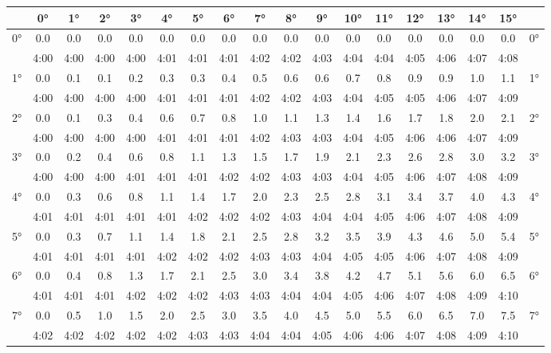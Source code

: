 \begin{footnotesize}\begin{tabular}{c || c | c | c | c | c | c | c | c | c | c | c | c | c | c | c | c || c}
		\space &0°&1°&2°&3°&4°&5°&6°&7°&8°&9°&10°&11°&12°&13°&14°&15°\\\hline\hline
		\multirow{2}{*}{0°}&0.0&0.0&0.0&0.0&0.0&0.0&0.0&0.0&0.0&0.0&0.0&0.0&0.0&0.0&0.0&0.0&\multirow{2}{*}{0°}\\ \space&4:00&4:00&4:00&4:00&4:01&4:01&4:01&4:02&4:02&4:03&4:04&4:04&4:05&4:06&4:07&4:08&\space\\\hline
		\multirow{2}{*}{1°}&0.0&0.1&0.1&0.2&0.3&0.3&0.4&0.5&0.6&0.6&0.7&0.8&0.9&0.9&1.0&1.1&\multirow{2}{*}{1°}\\ \space&4:00&4:00&4:00&4:00&4:01&4:01&4:01&4:02&4:02&4:03&4:04&4:05&4:05&4:06&4:07&4:09&\space\\\hline
		\multirow{2}{*}{2°}&0.0&0.1&0.3&0.4&0.6&0.7&0.8&1.0&1.1&1.3&1.4&1.6&1.7&1.8&2.0&2.1&\multirow{2}{*}{2°}\\ \space&4:00&4:00&4:00&4:00&4:01&4:01&4:01&4:02&4:03&4:03&4:04&4:05&4:06&4:06&4:07&4:09&\space\\\hline
		\multirow{2}{*}{3°}&0.0&0.2&0.4&0.6&0.8&1.1&1.3&1.5&1.7&1.9&2.1&2.3&2.6&2.8&3.0&3.2&\multirow{2}{*}{3°}\\ \space&4:00&4:00&4:00&4:01&4:01&4:01&4:02&4:02&4:03&4:03&4:04&4:05&4:06&4:07&4:08&4:09&\space\\\hline
		\multirow{2}{*}{4°}&0.0&0.3&0.6&0.8&1.1&1.4&1.7&2.0&2.3&2.5&2.8&3.1&3.4&3.7&4.0&4.3&\multirow{2}{*}{4°}\\ \space&4:01&4:01&4:01&4:01&4:01&4:02&4:02&4:02&4:03&4:04&4:04&4:05&4:06&4:07&4:08&4:09&\space\\\hline
		\multirow{2}{*}{5°}&0.0&0.3&0.7&1.1&1.4&1.8&2.1&2.5&2.8&3.2&3.5&3.9&4.3&4.6&5.0&5.4&\multirow{2}{*}{5°}\\ \space&4:01&4:01&4:01&4:01&4:02&4:02&4:02&4:03&4:03&4:04&4:05&4:05&4:06&4:07&4:08&4:09&\space\\\hline
		\multirow{2}{*}{6°}&0.0&0.4&0.8&1.3&1.7&2.1&2.5&3.0&3.4&3.8&4.2&4.7&5.1&5.6&6.0&6.5&\multirow{2}{*}{6°}\\ \space&4:01&4:01&4:01&4:02&4:02&4:02&4:03&4:03&4:04&4:04&4:05&4:06&4:07&4:08&4:09&4:10&\space\\\hline
		\multirow{2}{*}{7°}&0.0&0.5&1.0&1.5&2.0&2.5&3.0&3.5&4.0&4.5&5.0&5.5&6.0&6.5&7.0&7.5&\multirow{2}{*}{7°}\\ \space&4:02&4:02&4:02&4:02&4:02&4:03&4:03&4:04&4:04&4:05&4:06&4:06&4:07&4:08&4:09&4:10&\space\\\hline

\end{tabular}
\end{footnotesize}
